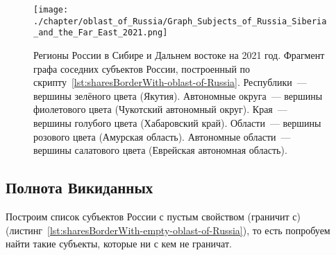 \begin{fullwidth}
\begin{figure*}[h]
	\texttt{[image: ./chapter/oblast\_of\_Russia/Graph\_Subjects\_of\_Russia\_Siberia\_and\_the\_Far\_East\_2021.png]}
	\caption[Граф субъектов России. Калининград, 2021.]{Регионы России в Сибире и Дальнем востоке на 2021 год. Фрагмент графа соседних субъектов России, построенный по скрипту~\protect\ref{lst:sharesBorderWith-oblast-of-Russia}.
	Республики~--- вершины зелёного цвета (Якутия).
	Автономные округа~--- вершины фиолетового цвета (Чукотский автономный округ).
	Края~--- вершины голубого цвета (Хабаровский край).
	Области~--- вершины розового цвета (Амурская область).
	Автономные области~--- вершины салатового цвета (Еврейская автономная область).}%
      \label{fig:sharesBorderWith-oblast-of-Russia-Kaliningrad-fig}%
\end{figure*} 
\end{fullwidth}

\newpage
\subsection{Полнота Викиданных}

Построим список субъектов России с пустым свойством  (граничит с) (листинг~\protect\ref{lst:sharesBorderWith-empty-oblast-of-Russia}), то есть попробуем найти такие субъекты, которые ни с кем не граничат.

\label{question:q_subjects_of_Russia_2}

